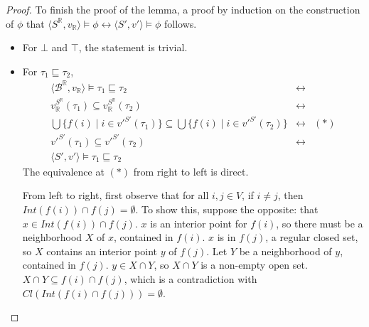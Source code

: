 \documentclass{article}
\newcommand{\R}{\mathbb{R}}
\newcommand{\B}{\mathcal{B}}
\newcommand{\lpart}{\sqsubseteq}
\begin{document}
\begin{proof}
    To finish the proof of the lemma, a proof by induction on the construction of $\phi$ that $\langle S^\R, v_\R \rangle \models \phi \leftrightarrow \langle S', v' \rangle \models \phi$ follows.
    \begin{itemize}
    \item For $\bot$ and $\top$, the statement is trivial.
    \item For $\tau_1 \lpart \tau_2$,
      \begin{align*}
        \langle \B^\R, v_\R \rangle \models \tau_1 \lpart \tau_2 &\leftrightarrow \\
        v_\R^{S^\R}(\tau_1) \subseteq v_\R^{S^\R}(\tau_2) &\leftrightarrow \\
        \bigcup\{f(i) \mid i \in v'^{S'}(\tau_1)\} \subseteq \bigcup\{f(i) \mid i \in v'^{S'}(\tau_2)\} &\leftrightarrow & (*) \\
        v'^{S'}(\tau_1) \subseteq v'^{S'}(\tau_2) &\leftrightarrow \\
        \langle S', v' \rangle \models \tau_1 \lpart \tau_2
      \end{align*}
      The equivalence at $(*)$ from right to left is direct.

      From left to right, first observe that for all $i, j \in V$, if $i \neq j$, then $Int(f(i)) \cap f(j) = \emptyset$. To show this, suppose the opposite: that $x \in Int(f(i)) \cap f(j)$. $x$ is an interior point for $f(i)$, so there must be a neighborhood $X$ of $x$, contained in $f(i)$. $x$ is in $f(j)$, a regular closed set, so $X$ contains an interior point $y$ of $f(j)$. Let $Y$ be a neighborhood of $y$, contained in $f(j)$. $y \in X \cap Y$, so $X \cap Y$ is a non-empty open set. $X \cap Y \subseteq f(i) \cap f(j)$, which is a contradiction with $Cl(Int(f(i) \cap f(j))) = \emptyset$.


\end{itemize}
\end{proof}
\end{document}
